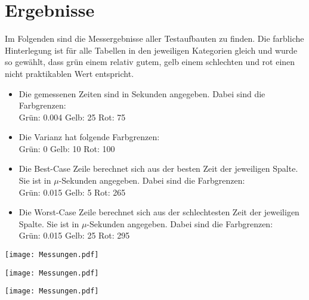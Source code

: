 \documentclass{scrreprt}
\begin{document}
\section{Ergebnisse}
\label{sec:results}
Im Folgenden sind die Messergebnisse aller Testaufbauten zu finden. Die farbliche Hinterlegung ist für alle Tabellen in den jeweiligen Kategorien gleich und wurde so gewählt, dass grün einem relativ gutem, gelb einem schlechten und rot einen nicht praktikablen Wert entspricht.
\begin{itemize}
\item Die gemessenen Zeiten sind in Sekunden angegeben. Dabei sind die Farbgrenzen:\\
Grün: 0.004\qquad
Gelb: 25\qquad
Rot:  75
\item Die Varianz hat folgende Farbgrenzen:\\
Grün:	0\qquad
Gelb:	10\qquad
Rot:	100
\item Die Best-Case Zeile berechnet sich aus der besten Zeit der jeweiligen Spalte. Sie ist in $\mu$-Sekunden angegeben. Dabei sind die Farbgrenzen:\\
Grün:	0.015\qquad
Gelb:	5\qquad
Rot:	265
\item Die Worst-Case Zeile berechnet sich aus der schlechtesten Zeit der jeweiligen Spalte. Sie ist in $\mu$-Sekunden angegeben. Dabei sind die Farbgrenzen:\\
Grün:	0.015\qquad
Gelb:	25\qquad
Rot:	295
\end{itemize}

\begin{table}[!ht]
\centering
\texttt{[image: Messungen.pdf]}
\caption{Messergebnisse im Modus \lstinline|local| (mit einer Maschine)}
\label{tab:local}
\end{table}

\begin{table}[!ht]
\centering
\texttt{[image: Messungen.pdf]}
\caption{Messergebnisse im Modus \lstinline|remote| (mit zwei Maschinen)}
\label{tab:remote}
\end{table}

\begin{table}[!ht]
\centering
\texttt{[image: Messungen.pdf]}
\caption{Messergebnisse im Modus \lstinline|distributed| mit einer Maschine}
\label{tab:dist1}
\end{table}
\end{document}
